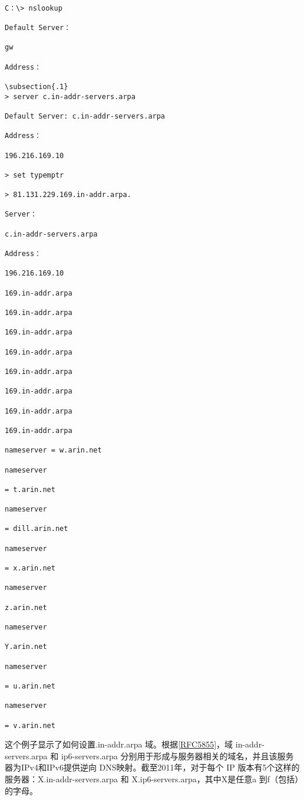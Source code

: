 \begin{verbatim}
    
C：\> nslookup

Default Server：

gw

Address：

\subsection{.1}
> server c.in-addr-servers.arpa

Default Server: c.in-addr-servers.arpa

Address：

196.216.169.10

> set typemptr

> 81.131.229.169.in-addr.arpa.

Server：

c.in-addr-servers.arpa

Address：

196.216.169.10

169.in-addr.arpa

169.in-addr.arpa

169.in-addr.arpa

169.in-addr.arpa

169.in-addr.arpa

169.in-addr.arpa

169.in-addr.arpa

169.in-addr.arpa

nameserver = w.arin.net

nameserver

= t.arin.net

nameserver

= dill.arin.net

nameserver

= x.arin.net

nameserver

z.arin.net

nameserver

Y.arin.net

nameserver

= u.arin.net

nameserver

= v.arin.net
\end{verbatim}

这个例子显示了如何设置.in-addr.arpa 域。根据\href{https://www.rfc-editor.org/rfc/rfc5855}{[RFC5855]}，域 in-addr-servers.arpa 和
ip6-servers.arpa 分别用于形成与服务器相关的域名，并且该服务器为IPv4和IPv6提供逆向
DNS映射。截至2011年，对于每个 IP 版本有5个这样的服务器：X.in-addr-servers.arpa 和
X.ip6-servers.arpa，其中X是任意a 到f（包括）的字母。

